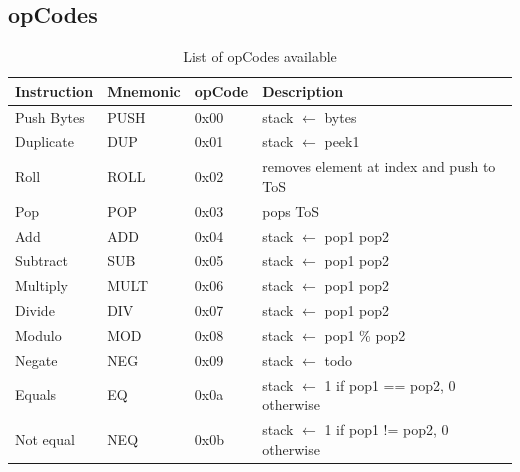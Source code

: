 \subsection{opCodes}
\begin{table}[]
\centering
\caption{List of opCodes available}
\label{opcodes-list}
\begin{tabular}{@{}llll@{}}
\toprule
\textbf{Instruction} & \textbf{Mnemonic} & \textbf{opCode} & \textbf{Description}                                     \\ \midrule
Push Bytes           & PUSH              & 0x00            & stack $\leftarrow$ bytes                                            \\
Duplicate            & DUP               & 0x01            & stack $\leftarrow$ peek1                           \\
Roll                 & ROLL              & 0x02            & removes element at index and push to ToS           \\
Pop                  & POP               & 0x03            & pops ToS                                                 \\
Add                  & ADD               & 0x04            & stack $\leftarrow$ pop1 \+ pop2                                      \\
Subtract             & SUB               & 0x05            & stack $\leftarrow$ pop1 \- pop2                                      \\
Multiply             & MULT              & 0x06            & stack $\leftarrow$ pop1 \* pop2                                      \\
Divide               & DIV               & 0x07            & stack $\leftarrow$ pop1 \/ pop2                                      \\
Modulo               & MOD               & 0x08            & stack $\leftarrow$ pop1 \% pop2                                     \\
Negate               & NEG               & 0x09            & stack $\leftarrow$ todo                                             \\
Equals               & EQ                & 0x0a            & stack $\leftarrow$ 1 if pop1 == pop2, 0 otherwise                   \\
Not equal            & NEQ               & 0x0b            & stack $\leftarrow$ 1 if pop1 != pop2, 0 otherwise                   \\

\end{tabular}
\end{table}
